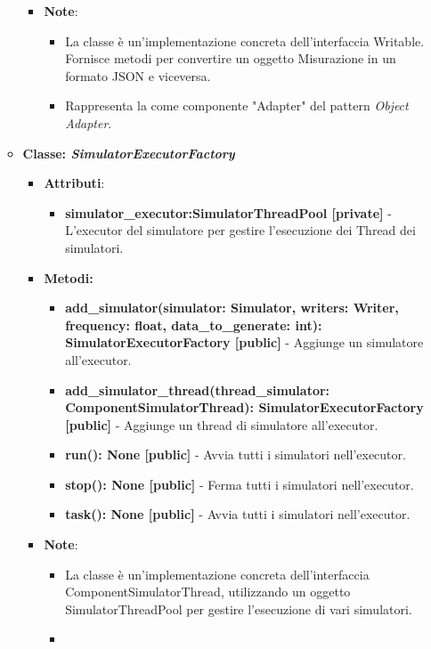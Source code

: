 \begin{itemize}
\begin{itemize}
\begin{itemize}
    \item\textbf{Note}:
        \begin{itemize}
            \item La classe è un'implementazione concreta dell'interfaccia Writable. Fornisce metodi per convertire un oggetto Misurazione in un formato JSON e viceversa.
            \item Rappresenta la come componente "Adapter" del pattern \textit{Object Adapter}.
        \end{itemize}
    \end{itemize}
    \item{\textbf{Classe: \textit{SimulatorExecutorFactory}}}
    \begin{itemize}
    \item\textbf{Attributi}:
        \begin{itemize}
        \item \textbf{simulator\_executor:SimulatorThreadPool [private]} - L'executor del simulatore per gestire l'esecuzione dei Thread dei simulatori.
    \end{itemize}
    \item \textbf{Metodi: }
    \begin{itemize}
        \item \textbf{add\_simulator(simulator: Simulator, writers: Writer, frequency: float, data\_to\_generate: int): SimulatorExecutorFactory [public]} - Aggiunge un simulatore all'executor.
        \item \textbf{add\_simulator\_thread(thread\_simulator: ComponentSimulatorThread): SimulatorExecutorFactory [public]} - Aggiunge un thread di simulatore all'executor.
        \item \textbf{run(): None [public]} - Avvia tutti i simulatori nell'executor.
        \item \textbf{stop(): None [public]} - Ferma tutti i simulatori nell'executor.
        \item \textbf{task(): None [public]} - Avvia tutti i simulatori nell'executor.
    \end{itemize}
    \item\textbf{Note}:
        \begin{itemize}
            \item La classe è un'implementazione concreta dell'interfaccia ComponentSimulatorThread, utilizzando un oggetto SimulatorThreadPool per gestire l'esecuzione di vari simulatori.
            \item 
        \end{itemize}

\end{itemize}
\end{itemize}
\end{itemize}
